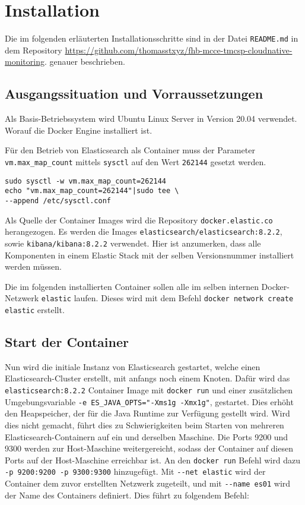 \section{Installation}
Die im folgenden erläuterten Installationsschritte
sind in der Datei \verb|README.md| in dem Repository
\url{https://github.com/thomasstxyz/fhb-mcce-tmcsp-cloudnative-monitoring}.
genauer beschrieben.

\subsection{Ausgangssituation und Vorraussetzungen}
Als Basis-Betriebssystem wird Ubuntu Linux Server
in Version 20.04 \cite{ubuntuServerWebsite} verwendet.
Worauf die Docker Engine \cite{dockerEngineWebsite} installiert ist.

Für den Betrieb von Elasticsearch als Container muss der
Parameter \verb|vm.max_map_count| mittels \verb|sysctl|
auf den Wert \verb|262144| gesetzt werden.

\begin{verbatim}
sudo sysctl -w vm.max_map_count=262144
echo "vm.max_map_count=262144"|sudo tee \
--append /etc/sysctl.conf
\end{verbatim}

Als Quelle der Container Images wird die Repository
\verb|docker.elastic.co| herangezogen.
Es werden die Images \verb|elasticsearch/elasticsearch:8.2.2|, sowie
\verb|kibana/kibana:8.2.2| verwendet.
Hier ist anzumerken, dass alle Komponenten in einem
Elastic Stack mit der selben Versionsnummer installiert werden
müssen.

Die im folgenden installierten Container sollen alle
im selben internen Docker-Netzwerk \verb|elastic| laufen.
Dieses wird mit dem Befehl
\verb|docker network create elastic| erstellt.


\subsection{Start der Container}
Nun wird die initiale Instanz von Elasticsearch gestartet,
welche einen Elasticsearch-Cluster erstellt, mit anfangs
noch einem Knoten.
Dafür wird das \verb|elasticsearch:8.2.2| Container Image
mit \verb|docker run| und einer zusätzlichen Umgebungsvariable
\verb|-e ES_JAVA_OPTS="-Xms1g -Xmx1g"|,
gestartet. Dies erhöht den Heapspeicher, der für die
Java Runtime zur Verfügung gestellt wird.
Wird dies nicht gemacht, führt dies zu Schwierigkeiten
beim Starten von mehreren Elasticsearch-Containern
auf ein und derselben Maschine.
Die Ports 9200 und 9300 werden zur Host-Maschine weitergereicht,
sodass der Container auf diesen Ports auf der Host-Maschine
erreichbar ist. An den \verb|docker run| Befehl wird
dazu \verb|-p 9200:9200 -p 9300:9300| hinzugefügt.
Mit \verb|--net elastic| wird der Container dem zuvor erstellten
Netzwerk zugeteilt, und mit \verb|--name es01| wird der Name
des Containers definiert.
Dies führt zu folgendem Befehl:

